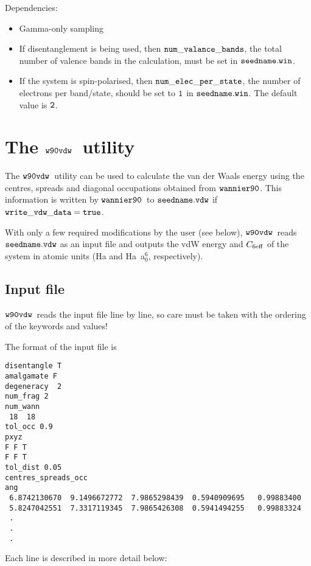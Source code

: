 \documentclass{report}
\newcommand{\wvdw}{{$\tt{w90vdw}$}}
\newcommand{\wannier}{{$\tt{wannier90}$}}
\begin{document}
Dependencies: 
\begin{itemize}
\item Gamma-only sampling
\item If disentanglement is being used, then $\tt{num\_valance\_bands}$, the
  total number of valence bands in the calculation,
  must be set in $\tt{seedname.win}$.
\item If the system is spin-polarised, then
  $\tt{num\_elec\_per\_state}$, the number of electrons per band/state, 
  should be set to $\tt{1}$ in
  $\tt{seedname.win}$. The default value is $\tt{2}$.
\end{itemize}


\section{The \wvdw\ utility}
The \wvdw\ utility can be used to calculate the van der Waals energy
using the centres, spreads and diagonal occupations obtained from
\wannier. This information is written by \wannier\ to
$\tt{seedname.vdw}$ if $\tt{write\_vdw\_data = true}$. 
 
With only a few required modifications by the user (see below),
\wvdw\ reads $\tt{seedname.vdw}$ as an input file and outputs 
the vdW energy and $C_{6\rm {eff}}$ of the system in atomic units (Ha
and Ha~a$_0^6$, respectively).

\subsection{Input file}

\wvdw\ reads the input file line by line, so care must be taken with
the ordering of the keywords and values! 

The format of the input file is

\begin{verbatim}
disentangle T
amalgamate F
degeneracy  2
num_frag 2
num_wann
 18  18
tol_occ 0.9
pxyz
F F T
F F T
tol_dist 0.05
centres_spreads_occ
ang
 6.8742130670  9.1496672772  7.9865298439  0.5940909695   0.99883400
 5.8247042551  7.3317119345  7.9865426308  0.5941494255   0.99883324
 .
 .
 .
\end{verbatim}

Each line is described in more detail below:
\end{document}
